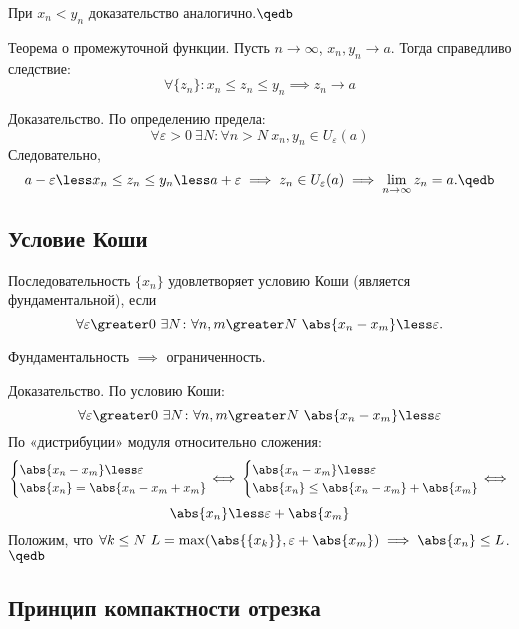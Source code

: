 При $x_n\less y_n$ доказательство аналогично.$\qedb$

\begin{theorem}
{\bold Теорема о промежуточной функции.} Пусть $n\to\infty$, $x_n,y_n\to a$. Тогда справедливо следствие:
$$\forall\{z_n\}\colon x_n\leq z_n\leq y_n\implies z_n\to a$$
\end{theorem}

{\bold Доказательство.} По определению предела:
$$\forall\varepsilon\greater 0\ \exists N\colon\forall n\greater N\ x_n,y_n\in U_
\varepsilon(a)$$
Следовательно,
$$a-\varepsilon\less x_n\leq z_n\leq y_n\less a+\varepsilon\implies z_n\in U_
\varepsilon(a)\implies\lim_{n\to\infty}z_n=a.\qedb$$

\subsection{Условие Коши}

Последовательность $\{x_n\}$ удовлетворяет {\bold условию Коши} {\ital\color{desc} 
(является фундаментальной)}, если
$$\forall\varepsilon\greater 0\ \exists N\colon\forall n,m\greater N\ \abs{x_n-x_m}\less
\varepsilon.$$
\begin{theorem}
Фундаментальность $\implies$ ограниченность.
\end{theorem}
{\bold Доказательство.} По условию Коши:
$$\forall\varepsilon\greater 0\ \exists N\colon\forall n,m\greater N\ \abs{x_n-x_m}\less
\varepsilon$$
По «дистрибуции» модуля относительно сложения:
$$\begin{cases}
\abs{x_n-x_m}\less\varepsilon\\
\abs{x_n}=\abs{x_n-x_m+x_m}
\end{cases}\hspace*{-12pt}\iff
\begin{cases}
\abs{x_n-x_m}\less\varepsilon\\
\abs{x_n}\leq\abs{x_n-x_m}+\abs{x_m}
\end{cases}\hspace*{-12pt}\iff$$
$$\abs{x_n}\less\varepsilon+\abs{x_m}$$
Положим, что $\forall k\leq N\ L=\max(\abs{\{x_k\}},\varepsilon+\abs{x_m})\implies
\abs{x_n}\leq L$.$\qedb$

\subsection{Принцип компактности отрезка}

